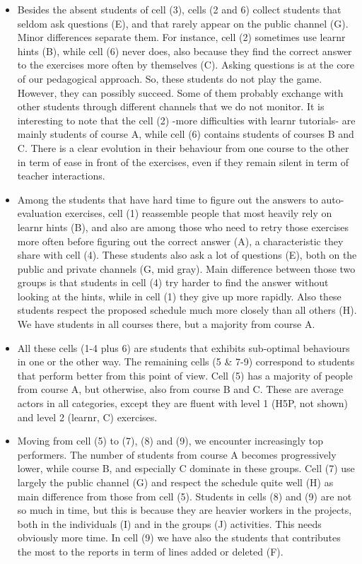 \documentclass[
]{article}
\begin{document}
\begin{itemize}
\item
  Besides the absent students of cell (3), cells (2 and 6) collect
  students that seldom ask questions (E), and that rarely appear on the
  public channel (G). Minor differences separate them. For instance,
  cell (2) sometimes use learnr hints (B), while cell (6) never does,
  also because they find the correct answer to the exercises more often
  by themselves (C). Asking questions is at the core of our pedagogical
  approach. So, these students do not play the game. However, they can
  possibly succeed. Some of them probably exchange with other students
  through different channels that we do not monitor. It is interesting
  to note that the cell (2) -more difficulties with learnr tutorials-
  are mainly students of course A, while cell (6) contains students of
  courses B and C. There is a clear evolution in their behaviour from
  one course to the other in term of ease in front of the exercises,
  even if they remain silent in term of teacher interactions.
\item
  Among the students that have hard time to figure out the answers to
  auto-evaluation exercises, cell (1) reassemble people that most
  heavily rely on learnr hints (B), and also are among those who need to
  retry those exercises more often before figuring out the correct
  answer (A), a characteristic they share with cell (4). These students
  also ask a lot of questions (E), both on the public and private
  channels (G, mid gray). Main difference between those two groups is
  that students in cell (4) try harder to find the answer without
  looking at the hints, while in cell (1) they give up more rapidly.
  Also these students respect the proposed schedule much more closely
  than all others (H). We have students in all courses there, but a
  majority from course A.
\item
  All these cells (1-4 plus 6) are students that exhibits sub-optimal
  behaviours in one or the other way. The remaining cells (5 \& 7-9)
  correspond to students that perform better from this point of view.
  Cell (5) has a majority of people from course A, but otherwise, also
  from course B and C. These are average actors in all categories,
  except they are fluent with level 1 (H5P, not shown) and level 2
  (learnr, C) exercises.
\item
  Moving from cell (5) to (7), (8) and (9), we encounter increasingly
  top performers. The number of students from course A becomes
  progressively lower, while course B, and especially C dominate in
  these groups. Cell (7) use largely the public channel (G) and respect
  the schedule quite well (H) as main difference from those from cell
  (5). Students in cells (8) and (9) are not so much in time, but this
  is because they are heavier workers in the projects, both in the
  individuals (I) and in the groups (J) activities. This needs obviously
  more time. In cell (9) we have also the students that contributes the
  most to the reports in term of lines added or deleted (F).
\end{itemize}
\end{document}
